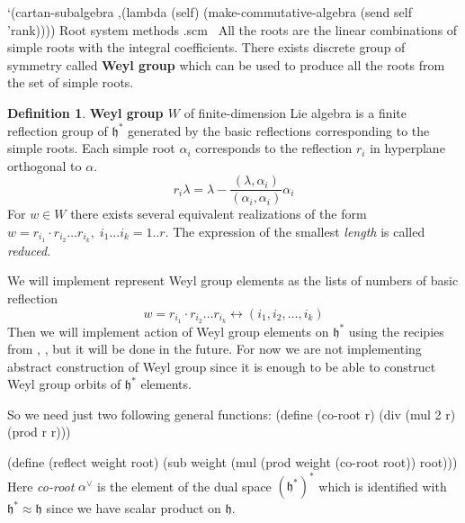 \documentclass[a4paper,10pt]{article}%
\theoremstyle{definition} \newtheorem{Def}{Definition}
\begin{document}
`(cartan-subalgebra ,(lambda (self)
    (make-commutative-algebra (send self 'rank))))
\LA{}Root system methods .scm~{\nwtagstyle{}}\RA{}
\nwendcode{}\nwdocspar
All the roots are the linear combinations of simple roots with the integral coefficients. There exists discrete group of symmetry called {\bf Weyl group} which can be used to produce all the roots from the set of simple roots. 
\begin{Def}
  \label{weyl-group-def}
  {\bf Weyl group $W$} of finite-dimension Lie algebra is a finite reflection group of $\mathfrak{h}^*$ generated by the basic reflections corresponding to the simple roots. 
  Each simple root $\alpha_i$ corresponds to the reflection $r_{i}$ in hyperplane orthogonal to $\alpha$.
  \begin{equation}
    \label{eq:5}
    r_{i}\lambda=\lambda-\frac{(\lambda,\alpha_i)}{(\alpha_i,\alpha_i)}\alpha_i
  \end{equation}
  For $w\in W$ there exists several equivalent realizations of the form $w=r_{i_1}\cdot r_{i_2}\dots r_{i_k},\; i_1\dots i_k=1..r$. The expression of the smallest {\it length} is called {\it reduced}. 
\end{Def}
We will implement represent Weyl group elements as the lists of numbers of basic reflection
\begin{equation}
  \label{eq:6}
  w=r_{i_1}\cdot r_{i_2}\dots r_{i_k} \leftrightarrow (i_1, i_2,\dots,i_k)
\end{equation}
Then we will implement action of Weyl group elements on $\mathfrak{h}^*$ using the recipies from \cite{stembridge2001computational}, \cite{casselman1994machine}, but it will be done in the future. For now we are not implementing abstract construction of Weyl group since it is enough to be able to construct Weyl group orbits of $\mathfrak{h}^*$ elements.

So we need just two following general functions:
\nwenddocs{}\endmoddef\nwstartdeflinemarkup{}\nwenddeflinemarkup
(define (co-root r)
  (div (mul 2 r) (prod r r)))

(define (reflect weight root)
  (sub weight (mul (prod weight (co-root root)) root)))
\nwendcode{}\nwdocspar
Here {\it co-root} $\alpha^{\vee}$ is the element of the dual space $(\mathfrak{h}^*)^*$ which is identified with $\mathfrak{h}^*\approx \mathfrak{h}$ since we have scalar product on $\mathfrak{h}$.
\end{document}
